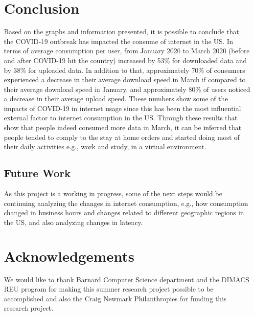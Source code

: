 \documentclass[conference,10pt]{IEEEtran}
\begin{document}
\section{Conclusion}
\label{sec:conclusion}

Based on the graphs and information presented, it is possible to conclude that the COVID-19 outbreak has impacted the consume of internet in the US. In terms of average consumption per user, from January 2020 to March 2020 (before and after COVID-19 hit the country) increased by 53\% for downloaded data and by 38\% for uploaded data. In addition to that, approximately 70\% of consumers experienced a decrease in their average download speed in March if compared to their average download speed in January, and approximately 80\% of users noticed a decrease in their average upload speed. These numbers show some of the impacts of COVID-19 in internet usage since this has been the most influential external factor to internet consumption in the US. Through these results that show that people indeed consumed more data in March, it can be inferred that people tended to comply to the stay at home orders and started doing most of their daily activities e.g., work and study, in a virtual environment.

\subsection{Future Work}
\label{sec:future-work}

As this project is a working in progress, some of the next steps would be continuing analyzing the changes in internet consumption, e.g., how consumption changed in business hours and changes related to different geographic regions in the US, and also analyzing changes in latency.

\section{Acknowledgements}
\label{sec:acknowledgements}

We would like to thank Barnard Computer Science department and the DIMACS REU program for making this summer research project possible to be accomplished and also the Craig Newmark Philanthropies for funding this research project.



\end{document}
